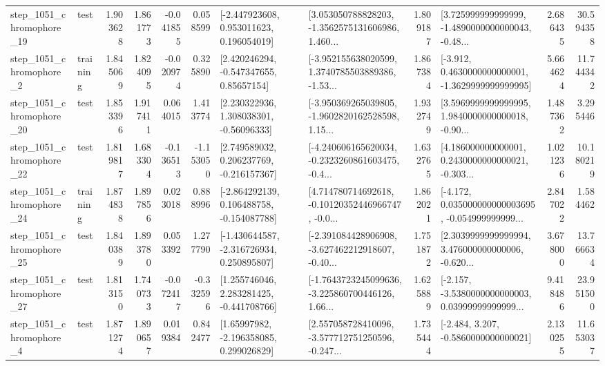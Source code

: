 \begin{tabular}{llrrrrllrlrr}
 step\_1051\_chromophore\_19 &      test &      1.903628 &    1.861773 &     -0.041855 &  0.058599 &    [-2.447923608, 0.953011623, 0.196054019] &  [3.053050788828203, -1.3562575131606986, 1.460... &       1.809187 &  [3.725999999999999, -1.4890000000000043, -0.48... &            2.686435 &         30.594358 \\
  step\_1051\_chromophore\_2 &  training &      1.845069 &    1.824095 &     -0.020974 &  0.325890 &     [2.420246294, -0.547347655, 0.85657154] &  [-3.952155638020599, 1.3740785503889386, -1.53... &       1.867384 &  [-3.912, 0.4630000000000001, -1.3629999999999995] &            5.664624 &         11.744342 \\
 step\_1051\_chromophore\_20 &      test &      1.853396 &    1.917411 &      0.064015 &  1.413774 &     [2.230322936, 1.308038301, -0.56096333] &  [-3.950369265039805, -1.9602820162528598, 1.15... &       1.932749 &  [3.5969999999999995, 1.9840000000000018, -0.90... &            1.487362 &          3.295446 \\
 step\_1051\_chromophore\_22 &      test &      1.819817 &    1.683304 &     -0.136513 & -1.153050 &    [2.749589032, 0.206237769, -0.216157367] &  [-4.240606165620034, -0.2323260861603475, -0.4... &       1.632765 &  [4.186000000000001, 0.2430000000000021, -0.303... &            1.021236 &         10.180219 \\
 step\_1051\_chromophore\_24 &  training &      1.874838 &    1.897856 &      0.023018 &  0.888996 &   [-2.864292139, 0.106488758, -0.154087788] &  [4.714780714692618, -0.10120352446966747, -0.0... &       1.862021 &  [-4.172, 0.035000000000003695, -0.054999999999... &            2.847022 &          1.584462 \\
 step\_1051\_chromophore\_25 &      test &      1.840389 &    1.893780 &      0.053392 &  1.277790 &   [-1.430644587, -2.316726934, 0.250895807] &  [-2.391084428906908, -3.627462212918607, -0.40... &       1.751872 &  [2.3039999999999994, 3.476000000000006, -0.620... &            3.678000 &         13.766634 \\
 step\_1051\_chromophore\_27 &      test &      1.813150 &    1.740733 &     -0.072417 & -0.332596 &    [1.255746046, 2.283281425, -0.441708766] &  [-1.7643723245099636, -3.225860700446126, 1.66... &       1.625889 &  [-2.157, -3.5380000000000003, 0.03999999999999... &            9.418486 &         23.951500 \\
  step\_1051\_chromophore\_4 &      test &      1.871274 &    1.890657 &      0.019384 &  0.842477 &     [1.65997982, -2.196358085, 0.299026829] &  [2.557058728410096, -3.577712751250596, -0.247... &       1.735444 &               [-2.484, 3.207, -0.5860000000000021] &            2.130255 &         11.653037 \\

\end{tabular}
